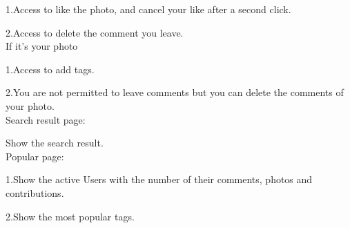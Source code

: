 \documentclass[11pt, oneside]{article}   	%
\begin{document}
1.Access to like the photo, and cancel your like after a second click.\par
2.Access to delete the comment you leave.\\[0.1cm]
If it's your photo\par
1.Access to add tags.\par
2.You are not permitted to leave comments but you can delete the comments of your photo.\\[0.3cm]
Search result page:\par
Show the search result.\\[0.3cm]
Popular page:\par
1.Show the active Users with the number of their comments, photos and contributions.\par
2.Show the most popular tags.\\ 
\end{document}
